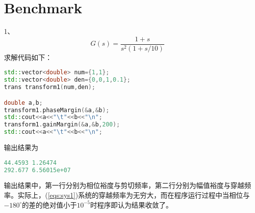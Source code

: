\documentclass[utf8]{ctexart}
\begin{document}
\section{Benchmark}
1、\begin{equation}\label{eqs:sys1}
G(s)=\frac{1+s}{s^2(1+s/10)}
\end{equation}
求解代码如下：
\begin{lstlisting}[language=C++]
std::vector<double> num={1,1};
std::vector<double> den={0,0,1,0.1};
trans transform1(num,den);

double a,b;
transform1.phaseMargin(&a,&b);
std::cout<<a<<"\t"<<b<<"\n";
transform1.gainMargin(&a,&b,200);
std::cout<<a<<"\t"<<b<<"\n";
\end{lstlisting}
输出结果为
\begin{lstlisting}[language=C++]
44.4593 1.26474
292.677 6.56015e+07
\end{lstlisting}
\par 输出结果中，第一行分别为相位裕度与剪切频率，第二行分别为幅值裕度与穿越频率。实际上，(\ref{eqs:sys1})系统的穿越频率为无穷大，而在程序运行过程中当相位与$-180^{\circ}$的差的绝对值小于$10^{-5}$时程序即认为结果收敛了。
\end{document}
